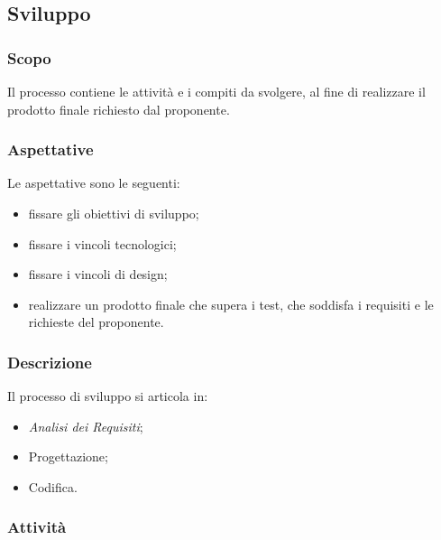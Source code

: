 \subsection{Sviluppo}
	\subsubsection{Scopo}
	Il processo contiene le attività e i compiti da svolgere, al fine di realizzare il prodotto finale richiesto dal proponente.
	\subsubsection{Aspettative}
	Le aspettative sono le seguenti:
	\begin{itemize}
		\item fissare gli obiettivi di sviluppo;
		\item fissare i vincoli tecnologici;
		\item fissare i vincoli di design;
		\item realizzare un prodotto finale che supera i test, che soddisfa i requisiti e le richieste del proponente.
	\end{itemize}
	\subsubsection{Descrizione}
	Il processo di sviluppo si articola in:
	\begin{itemize}
		\item \textit{Analisi dei Requisiti};
		\item Progettazione;
		\item Codifica.
	\end{itemize}
	\subsubsection{Attività}
